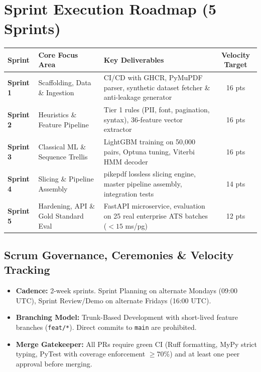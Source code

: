 \documentclass[11pt,a4paper]{article}
\begin{document}
\clearpage

\section{Sprint Execution Roadmap (5 Sprints)}

\vspace{0.4em}
\noindent
\small
\renewcommand{\arraystretch}{1.3}
\begin{tabularx}{\textwidth}{lp{4.2cm}Xc}
\toprule
\textbf{Sprint} & \textbf{Core Focus Area} & \textbf{Key Deliverables} & \textbf{Velocity Target} \\
\midrule
\textbf{Sprint 1} & Scaffolding, Data \& Ingestion & CI/CD with GHCR, PyMuPDF parser, synthetic dataset fetcher \& anti-leakage generator & 16 pts \\
\textbf{Sprint 2} & Heuristics \& Feature Pipeline & Tier 1 rules (PII, font, pagination, syntax), 36-feature vector extractor & 16 pts \\
\textbf{Sprint 3} & Classical ML \& Sequence Trellis & LightGBM training on 50,000 pairs, Optuna tuning, Viterbi HMM decoder & 16 pts \\
\textbf{Sprint 4} & Slicing \& Pipeline Assembly & pikepdf lossless slicing engine, master pipeline assembly, integration tests & 14 pts \\
\textbf{Sprint 5} & Hardening, API \& Gold Standard Eval & FastAPI microservice, evaluation on 25 real enterprise ATS batches ($<15$ ms/pg) & 12 pts \\
\bottomrule
\end{tabularx}

\vspace{1.5em}

\subsection{Scrum Governance, Ceremonies \& Velocity Tracking}
\begin{itemize}[leftmargin=1.5em, itemsep=3pt]
    \item \textbf{Cadence:} 2-week sprints. Sprint Planning on alternate Mondays (09:00 UTC), Sprint Review/Demo on alternate Fridays (16:00 UTC).
    \item \textbf{Branching Model:} Trunk-Based Development with short-lived feature branches (\texttt{feat/*}). Direct commits to \texttt{main} are prohibited.
    \item \textbf{Merge Gatekeeper:} All PRs require green CI (Ruff formatting, MyPy strict typing, PyTest with coverage enforcement $\ge 70\%$) and at least one peer approval before merging.
\end{itemize}
\end{document}
